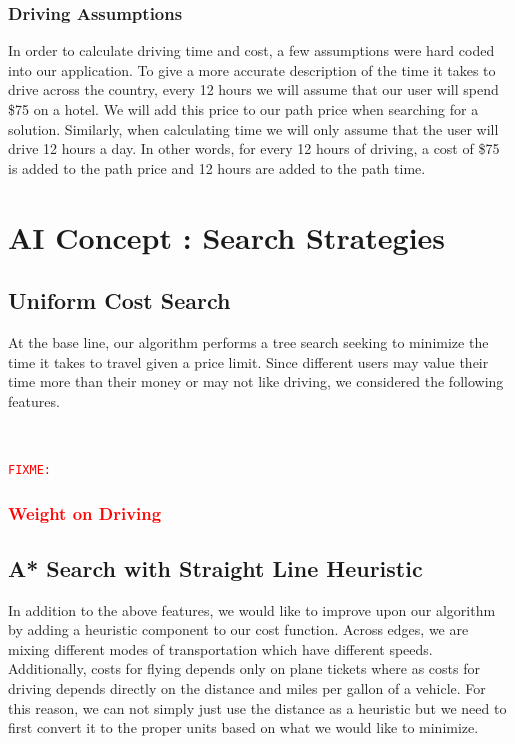 \documentclass[11pt]{article}
\newcommand{\FIXME}[1]{ \ \\ \hspace* {-1.5 cm}
  \textcolor{red}{\texttt{FIXME:}#1} \medskip\par}
\begin{document}
\subsubsection{Driving Assumptions}

In order to calculate driving time and cost, a few assumptions were hard coded into our application. To give a more accurate description of the time it takes to drive across the country, every 12 hours we will assume that our user will spend \$75 on a hotel. We will add this price to our path price when searching for a solution. Similarly, when calculating time we will only assume that the user will drive 12 hours a day. In other words, for every 12 hours of driving, a cost of \$75 is added to the path price and 12 hours are added to the path time.



\section{AI Concept : Search Strategies}\label{sec:search}

\subsection{Uniform Cost Search}

At the base line, our algorithm performs a tree search seeking to minimize the time it takes to travel given a price limit. 
Since different users may value their time more than their money or may not like driving, we considered the following features.

\FIXME{\subsubsection{Weight on Driving}}

\subsection{A* Search with Straight Line Heuristic}

In addition to the above features, we would like to improve upon our algorithm by adding a heuristic component to our cost function. 
Across edges, we are mixing different modes of transportation which have different speeds. Additionally, costs for flying depends only on plane tickets where as costs for driving depends directly on the distance and miles per gallon of a vehicle. 
For this reason, we can not simply just use the distance as a heuristic but we need to first convert it to the proper units based on what we would like to minimize.
\end{document}
